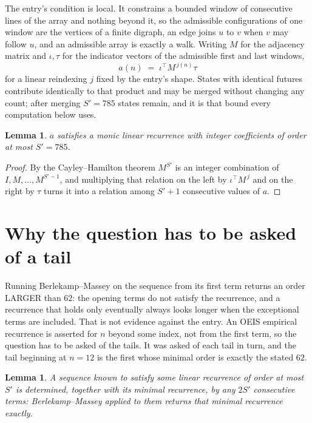 \documentclass[11pt,a4paper]{article}
\theoremstyle{plain}
\newtheorem{lemma}[theorem]{Lemma}
\theoremstyle{definition}
\begin{document}
The entry's condition is local. It constrains a bounded window of consecutive lines of the
array and nothing beyond it, so the admissible configurations of one window are the vertices of
a finite digraph, an edge joins $u$ to $v$ when $v$ may follow $u$, and an admissible array is
exactly a walk. Writing $M$ for the adjacency matrix and $\iota,\tau$ for the indicator vectors
of the admissible first and last windows,
\[
a(n)\;=\;\iota^{\!\top}M^{\,j(n)}\tau
\]
for a linear reindexing $j$ fixed by the entry's shape. States with identical futures
contribute identically to that product and may be merged without changing any count; after
merging $S'=785$ states remain, and it is that bound every computation below uses.

\begin{lemma}\label{lem:cf}
$a$ satisfies a monic linear recurrence with integer coefficients of order at most $S'=785$.
\end{lemma}

\begin{proof}
By the Cayley--Hamilton theorem $M^{S'}$ is an integer combination of $I,M,\dots,M^{S'-1}$,
and multiplying that relation on the left by $\iota^{\!\top}M^{\,j}$ and on the right by
$\tau$ turns it into a relation among $S'+1$ consecutive values of $a$.
\end{proof}

\section{Why the question has to be asked of a tail}

Running Berlekamp--Massey on the sequence from its first term returns an order LARGER than $62$: the opening terms do not satisfy the recurrence, and a recurrence that holds only eventually always looks longer when the exceptional terms are included. That is not evidence against the entry. An OEIS empirical recurrence is asserted for $n$ beyond some index, not from the first term, so the question has to be asked of the tails. It was asked of each tail in turn, and the tail beginning at $n=12$ is the first whose minimal order is exactly the stated $62$.

\begin{lemma}\label{lem:bm}
A sequence known to satisfy some linear recurrence of order at most $S'$ is determined,
together with its minimal recurrence, by any $2S'$ consecutive terms: Berlekamp--Massey applied
to them returns that minimal recurrence exactly.
\end{lemma}
\end{document}
